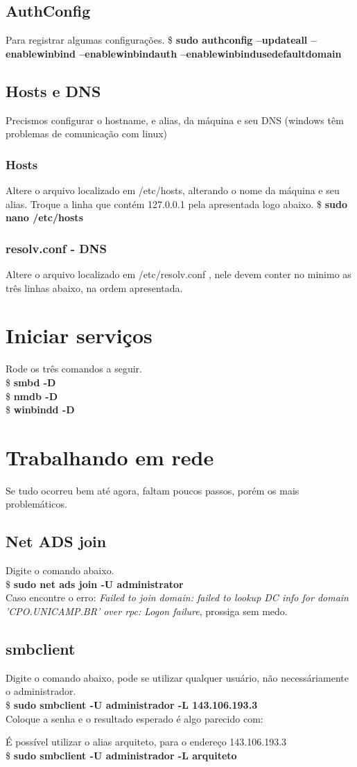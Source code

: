\documentclass[a4paper,10pt]{article}
\begin{document}
\subsection{AuthConfig}
Para registrar algumas configurações.
\$ \textbf{sudo authconfig --updateall --enablewinbind --enablewinbindauth --enablewinbindusedefaultdomain}
\subsection{Hosts e DNS}
Precismos configurar o hostname, e alias, da máquina e seu DNS (windows têm problemas de comunicação com linux)
\subsubsection{Hosts}
Altere o arquivo localizado em /etc/hosts, alterando o nome da máquina e seu alias.
Troque a linha que contém 127.0.0.1 pela apresentada logo abaixo.
\$  \textbf{sudo nano /etc/hosts}

\subsubsection{resolv.conf - DNS}
Altere o arquivo localizado em /etc/resolv.conf , nele devem conter no minimo as três linhas
abaixo, na ordem apresentada.

\section{Iniciar serviços}
Rode os três comandos a seguir.\\
\$ \textbf{smbd -D}\\
\$ \textbf{nmdb -D}\\
\$ \textbf{winbindd -D}\\
\section{Trabalhando em rede}
Se tudo ocorreu bem até agora, faltam poucos passos, porém os mais problemáticos.
\subsection{Net ADS join}
Digite o comando abaixo.\\
\$ \textbf{sudo net ads join -U administrator}\\
Caso encontre o erro: \emph{Failed to join domain: failed to lookup DC info for domain 'CPO.UNICAMP.BR' over rpc: Logon failure}, prossiga sem medo.
\subsection{smbclient}
Digite o comando abaixo, pode se utilizar qualquer usuário, não necessáriamente o administrador.\\
\$ \textbf{sudo smbclient -U administrador -L 143.106.193.3}\\
Coloque a senha e o resultado esperado é algo parecido com:

É possível utilizar o alias arquiteto, para o endereço 143.106.193.3\\
\$ \textbf{sudo smbclient -U administrador -L arquiteto}\\
\end{document}
